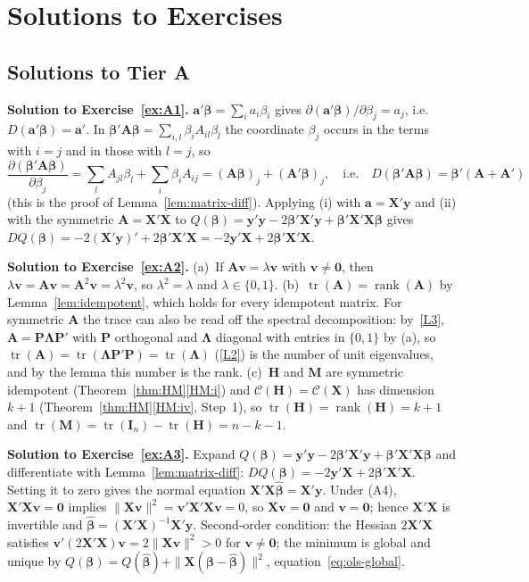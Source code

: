 \documentclass[12pt,a4paper]{article}
\theoremstyle{definition}
\DeclareMathOperator\tr{tr}
\DeclareMathOperator\rank{rank}
\newcommand{\bX}{\mathbf{X}}
\newcommand{\by}{\mathbf{y}}
\def\bb{\boldsymbol{\beta}}
\newcommand{\bI}{\mathbf{I}}
\newcommand{\bH}{\mathbf{H}}
\newcommand{\bM}{\mathbf{M}}
\newcommand{\bzero}{\mathbf{0}}
\newcommand{\bA}{\mathbf{A}}
\newcommand{\bP}{\mathbf{P}}
\newcommand{\ba}{\mathbf{a}}
\newcommand{\bv}{\mathbf{v}}
\newcommand{\calC}{\mathcal{C}}
\begin{document}
\section{Solutions to Exercises}

\subsection*{Solutions to Tier A}

\textbf{Solution to Exercise~\ref{ex:A1}.} $\ba'\bb = \sum_i a_i\beta_i$ gives $\partial(\ba'\bb)/\partial\beta_j = a_j$, i.e.\ $D(\ba'\bb) = \ba'$. In $\bb'\bA\bb = \sum_{i,l}\beta_iA_{il}\beta_l$ the coordinate $\beta_j$ occurs in the terms with $i = j$ and in those with $l = j$, so
\[
\frac{\partial(\bb'\bA\bb)}{\partial\beta_j} = \sum_l A_{jl}\beta_l + \sum_i \beta_iA_{ij} = (\bA\bb)_j + (\bA'\bb)_j, \quad\text{i.e.}\quad D(\bb'\bA\bb) = \bb'(\bA + \bA')
\]
(this is the proof of Lemma~\ref{lem:matrix-diff}). Applying (i) with $\ba = \bX'\by$ and (ii) with the symmetric $\bA = \bX'\bX$ to $Q(\bb) = \by'\by - 2\bb'\bX'\by + \bb'\bX'\bX\bb$ gives $DQ(\bb) = -2(\bX'\by)' + 2\bb'\bX'\bX = -2\by'\bX + 2\bb'\bX'\bX$.

\textbf{Solution to Exercise~\ref{ex:A2}.} (a)~If $\bA\bv = \lambda\bv$ with $\bv \neq \bzero$, then $\lambda\bv = \bA\bv = \bA^2\bv = \lambda^2\bv$, so $\lambda^2 = \lambda$ and $\lambda \in \{0, 1\}$. (b)~$\tr(\bA) = \rank(\bA)$ by Lemma~\ref{lem:idempotent}, which holds for every idempotent matrix. For symmetric $\bA$ the trace can also be read off the spectral decomposition: by~\ref{L3}, $\bA = \bP\boldsymbol\Lambda\bP'$ with $\bP$ orthogonal and $\boldsymbol\Lambda$ diagonal with entries in $\{0,1\}$ by (a), so $\tr(\bA) = \tr(\boldsymbol\Lambda\bP'\bP) = \tr(\boldsymbol\Lambda)$ (\ref{L2}) is the number of unit eigenvalues, and by the lemma this number is the rank. (c)~$\bH$ and $\bM$ are symmetric idempotent (Theorem~\ref{thm:HM}\ref{HM:i}) and $\calC(\bH) = \calC(\bX)$ has dimension $k+1$ (Theorem~\ref{thm:HM}\ref{HM:iv}, Step~1), so $\tr(\bH) = \rank(\bH) = k+1$ and $\tr(\bM) = \tr(\bI_n) - \tr(\bH) = n-k-1$.

\textbf{Solution to Exercise~\ref{ex:A3}.} Expand $Q(\bb) = \by'\by - 2\bb'\bX'\by + \bb'\bX'\bX\bb$ and differentiate with Lemma~\ref{lem:matrix-diff}: $DQ(\bb) = -2\by'\bX + 2\bb'\bX'\bX$. Setting it to zero gives the normal equation $\bX'\bX\hat{\bb} = \bX'\by$. Under (A4), $\bX'\bX\bv = \bzero$ implies $\|\bX\bv\|^2 = \bv'\bX'\bX\bv = 0$, so $\bX\bv = \bzero$ and $\bv = \bzero$; hence $\bX'\bX$ is invertible and $\hat{\bb} = (\bX'\bX)^{-1}\bX'\by$. Second-order condition: the Hessian $2\bX'\bX$ satisfies $\bv'(2\bX'\bX)\bv = 2\|\bX\bv\|^2 > 0$ for $\bv \neq \bzero$; the minimum is global and unique by $Q(\bb) = Q(\hat{\bb}) + \|\bX(\bb - \hat{\bb})\|^2$, equation~\eqref{eq:ols-global}.
\end{document}
